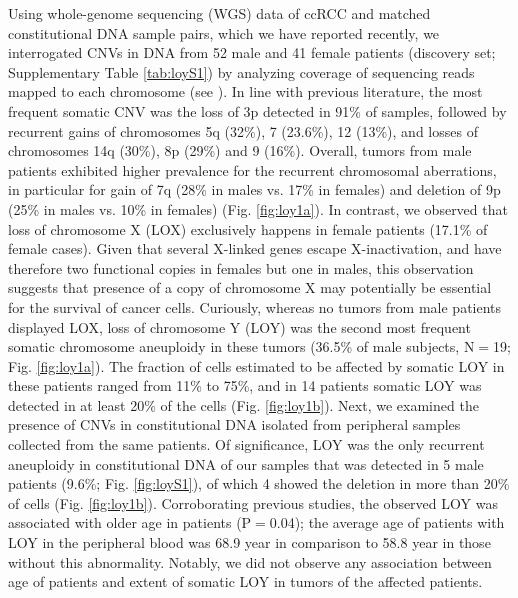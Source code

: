 Using whole-genome sequencing (WGS) data of ccRCC and matched constitutional DNA sample pairs, which we have reported recently\cite{Scelo2014}, we interrogated CNVs in DNA from 52 male and 41 female patients (discovery set; Supplementary Table \ref{tab:loyS1}) by analyzing coverage of sequencing reads mapped to each chromosome (see ).
In line with previous literature, the most frequent somatic CNV was the loss of 3p detected in 91\% of samples, followed by recurrent gains of chromosomes 5q (32\%), 7 (23.6\%), 12 (13\%), and losses of chromosomes 14q (30\%), 8p (29\%) and 9 (16\%).
Overall, tumors from male patients exhibited higher prevalence for the recurrent chromosomal aberrations, in particular for gain of 7q (28\% in males vs. 17\% in females) and deletion of 9p (25\% in males vs. 10\% in females) (Fig. \ref{fig:loy1a}).
In contrast, we observed that loss of chromosome X (LOX) exclusively happens in female patients (17.1\% of female cases).
Given that several X-linked genes escape X-inactivation, and have therefore two functional copies in females but one in males, this observation suggests that presence of a copy of chromosome X may potentially be essential for the survival of cancer cells.
Curiously, whereas no tumors from male patients displayed LOX, loss of chromosome Y (LOY) was the second most frequent somatic chromosome aneuploidy in these tumors (36.5\% of male subjects, N$=$19; Fig. \ref{fig:loy1a}).
The fraction of cells estimated to be affected by somatic LOY in these patients ranged from 11\% to 75\%, and in 14 patients somatic LOY was detected in at least 20\% of the cells (Fig. \ref{fig:loy1b}).
Next, we examined the presence of CNVs in constitutional DNA isolated from peripheral samples collected from the same patients.
Of significance, LOY was the only recurrent aneuploidy in constitutional DNA of our samples that was detected in 5 male patients (9.6\%; Fig. \ref{fig:loyS1}), of which 4 showed the deletion in more than 20\% of cells (Fig. \ref{fig:loy1b}).
Corroborating previous studies\cite{Pierre1972,Zhou2016}, the observed LOY was associated with older age in patients (P$=$0.04); the average age of patients with LOY in the peripheral blood was 68.9 year in comparison to 58.8 year in those without this abnormality.
Notably, we did not observe any association between age of patients and extent of somatic LOY in tumors of the affected patients.

